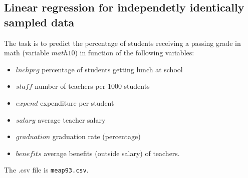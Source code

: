 \documentclass{article}
\begin{document}
 \subsection*{Linear regression for independetly identically sampled data}
    The task is to predict the percentage of students receiving a passing grade in math (variable $math10$) in function of 
    the following variables:
    \begin{itemize}
    \item{$lnchprg$}    
	    percentage of students getting lunch at school
     \item{$staff$}     
	    number of teachers per 1000 students
     \item{$expend$}    
	    expenditure per student
    \item{$salary$}
	    average teacher salary
    \item{$graduation$}
	    graduation rate (percentage)
    \item{$benefits$}
	    average benefits (outside salary) of teachers.
    \end{itemize}		    
     The .csv file is \lstinline$meap93.csv$.

\end{document}
